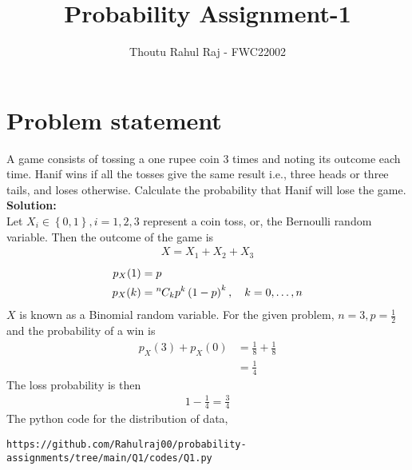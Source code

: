 \documentclass{article}
\newcommand*{\permcomb}[4][0mu]{{{}^{#3}\mkern#1#2_{#4}}}
\newcommand*{\comb}[1][-1mu]{\permcomb[#1]{C}}
\newcommand{\solution}{\noindent \textbf{Solution: }}
\begin{document}
\newcommand{\BEQA}{\begin{eqnarray}}
\newcommand{\EEQA}{\end{eqnarray}}
\newcommand{\define}{\stackrel{\triangle}{=}}
\raggedbottom
\setlength{\parindent}{0pt}
\providecommand{\mbf}{\mathbf}
\providecommand{\pr}[1]{\ensuremath{\Pr\left(#1\right)}}
\providecommand{\qfunc}[1]{\ensuremath{Q\left(#1\right)}}
\providecommand{\sbrak}[1]{\ensuremath{{}\left[#1\right]}}
\providecommand{\lsbrak}[1]{\ensuremath{{}\left[#1\right.}}
\providecommand{\rsbrak}[1]{\ensuremath{{}\left.#1\right]}}
\providecommand{\brak}[1]{\ensuremath{\left(#1\right)}}
\providecommand{\lbrak}[1]{\ensuremath{\left(#1\right.}}
\providecommand{\rbrak}[1]{\ensuremath{\left.#1\right)}}
\providecommand{\cbrak}[1]{\ensuremath{\left\{#1\right\}}}
\providecommand{\lcbrak}[1]{\ensuremath{\left\{#1\right.}}
\providecommand{\rcbrak}[1]{\ensuremath{\left.#1\right\}}}
\theoremstyle{remark}
\title{Probability Assignment-1}
\author{\Large Thoutu Rahul Raj - FWC22002}
\date{}
\maketitle
\setcounter{enumi}{3}
\setcounter{enumii}{6}
\section*{\large Problem statement}
A game consists of tossing a one rupee coin 3 times and noting its outcome each time. Hanif wins if all the tosses give the same result i.e., three heads or three tails, and loses otherwise. Calculate the probability that Hanif will lose the game.\\

\solution\\
Let $X_i\in \cbrak{0,1}, i = 1, 2, 3$ represent a coin toss, or, the Bernoulli random variable.  Then the outcome of the game is
\begin{align}
X = X_1+X_2+X_3	
\end{align}
\begin{align}
p_X(1) &= p\\
p_X(k) &= \comb{n}{k}p^k\brak{1-p}^k, \quad k = 0,\dots, n
\end{align}
$X$ is known as a Binomial random variable.  For the given problem, $n = 3, p = \frac{1}{2}$ and the probability of a win is 
\begin{align}
p_X(3) + p_X(0) &= \frac{1}{8}+\frac{1}{8}
\\
&= \frac{1}{4}
\end{align}
The loss probability is then
\begin{align}
1-\frac{1}{4} = \frac{3}{4}
\end{align}
The python code for the distribution of data,\\
\begin{lstlisting}
https://github.com/Rahulraj00/probability-assignments/tree/main/Q1/codes/Q1.py 
\end{lstlisting}   	
\end{document}
